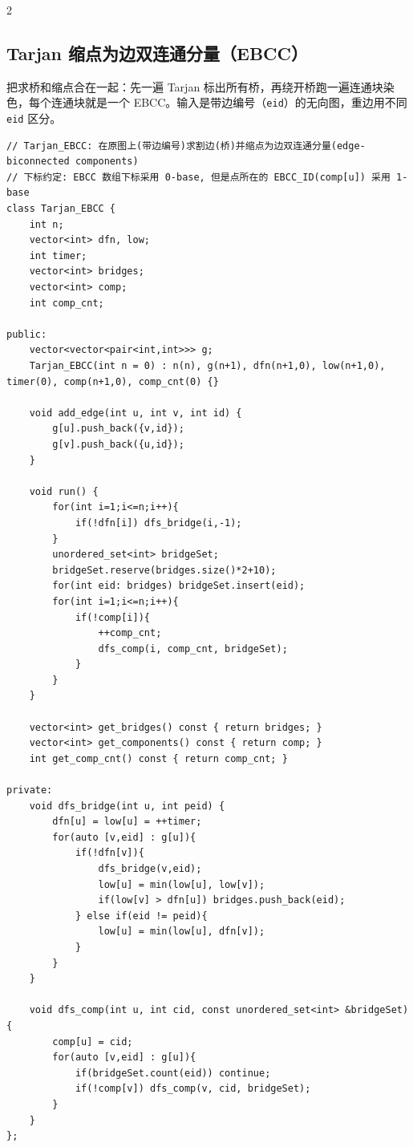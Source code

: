 \begin{multicols*}{2}
		\subsection{Tarjan 缩点为边双连通分量（EBCC）}

		把求桥和缩点合在一起：先一遍 Tarjan 标出所有桥，再绕开桥跑一遍连通块染色，每个连通块就是一个 EBCC。输入是带边编号（\texttt{eid}）的无向图，重边用不同 \texttt{eid} 区分。

		\begin{verbatim}
// Tarjan_EBCC: 在原图上(带边编号)求割边(桥)并缩点为边双连通分量(edge-biconnected components)
// 下标约定: EBCC 数组下标采用 0-base, 但是点所在的 EBCC_ID(comp[u]) 采用 1-base
class Tarjan_EBCC {
    int n;
    vector<int> dfn, low;
    int timer;
    vector<int> bridges;
    vector<int> comp;
    int comp_cnt;

public:
    vector<vector<pair<int,int>>> g;
    Tarjan_EBCC(int n = 0) : n(n), g(n+1), dfn(n+1,0), low(n+1,0), timer(0), comp(n+1,0), comp_cnt(0) {}

    void add_edge(int u, int v, int id) {
        g[u].push_back({v,id});
        g[v].push_back({u,id});
    }

    void run() {
        for(int i=1;i<=n;i++){
            if(!dfn[i]) dfs_bridge(i,-1);
        }
        unordered_set<int> bridgeSet;
        bridgeSet.reserve(bridges.size()*2+10);
        for(int eid: bridges) bridgeSet.insert(eid);
        for(int i=1;i<=n;i++){
            if(!comp[i]){
                ++comp_cnt;
                dfs_comp(i, comp_cnt, bridgeSet);
            }
        }
    }

    vector<int> get_bridges() const { return bridges; }
    vector<int> get_components() const { return comp; }
    int get_comp_cnt() const { return comp_cnt; }

private:
    void dfs_bridge(int u, int peid) {
        dfn[u] = low[u] = ++timer;
        for(auto [v,eid] : g[u]){
            if(!dfn[v]){
                dfs_bridge(v,eid);
                low[u] = min(low[u], low[v]);
                if(low[v] > dfn[u]) bridges.push_back(eid);
            } else if(eid != peid){
                low[u] = min(low[u], dfn[v]);
            }
        }
    }

    void dfs_comp(int u, int cid, const unordered_set<int> &bridgeSet) {
        comp[u] = cid;
        for(auto [v,eid] : g[u]){
            if(bridgeSet.count(eid)) continue;
            if(!comp[v]) dfs_comp(v, cid, bridgeSet);
        }
    }
};
		\end{verbatim}



\end{multicols*}
